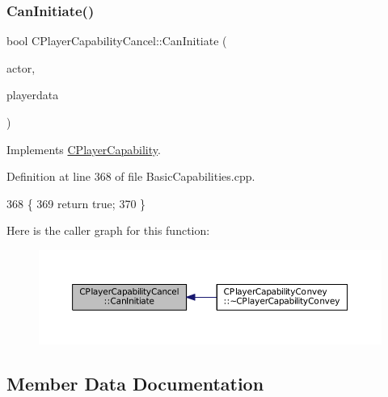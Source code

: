 \subsubsection{\texorpdfstring{Can\+Initiate()}{CanInitiate()}}
{\footnotesize\ttfamily bool C\+Player\+Capability\+Cancel\+::\+Can\+Initiate (\begin{DoxyParamCaption}\item[{std\+::shared\+\_\+ptr$<$ \hyperlink{classCPlayerAsset}{C\+Player\+Asset} $>$}]{actor,  }\item[{std\+::shared\+\_\+ptr$<$ \hyperlink{classCPlayerData}{C\+Player\+Data} $>$}]{playerdata }\end{DoxyParamCaption})\hspace{0.3cm}{\ttfamily [virtual]}}



Implements \hyperlink{classCPlayerCapability_aa83b1e1fcaff2985c378132d679154ea}{C\+Player\+Capability}.



Definition at line 368 of file Basic\+Capabilities.\+cpp.


\begin{DoxyCode}
368                                                                                                            
                \{
369     \textcolor{keywordflow}{return} \textcolor{keyword}{true};
370 \}
\end{DoxyCode}
Here is the caller graph for this function\+:\nopagebreak
\begin{figure}[H]
\begin{center}
\leavevmode
\includegraphics[width=350pt]{classCPlayerCapabilityCancel_a8b4ad4a4983b01e458d439cf68fd2ba9_icgraph}
\end{center}
\end{figure}


\subsection{Member Data Documentation}
\hypertarget{classCPlayerCapabilityCancel_a239d2a965e7441fd81b79b8421707ff1}{}\label{classCPlayerCapabilityCancel_a239d2a965e7441fd81b79b8421707ff1} 
